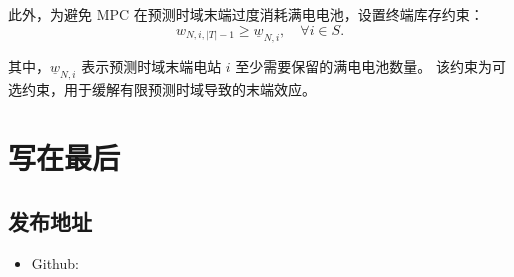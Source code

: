 \documentclass[12pt,hyperref,a4paper,UTF8]{ctexart}
\begin{document}
此外，为避免 MPC 在预测时域末端过度消耗满电电池，设置终端库存约束：
\begin{equation}
w_{N,i,|T|-1}\ge \underline{w}_{N,i},
\quad \forall i\in S.
\tag{9i}
\end{equation}

其中，$\underline{w}_{N,i}$ 表示预测时域末端电站 $i$ 至少需要保留的满电电池数量。
该约束为可选约束，用于缓解有限预测时域导致的末端效应。

\section{写在最后}
\subsection{发布地址}
\begin{itemize}
    \item Github: 
\end{itemize}


\end{document}
